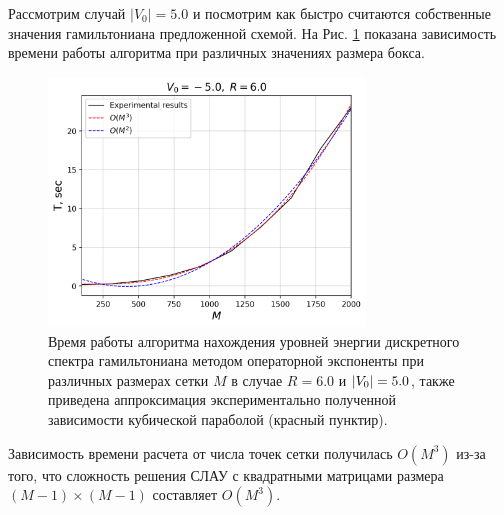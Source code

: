 \documentclass[11pt]{article}
\begin{document}
Рассмотрим случай $|V_0|=5.0$ и посмотрим как быстро считаются собственные значения гамильтониана предложенной схемой. На Рис. \ref{fig:T_vs_M_-5.0} показана зависимость времени работы алгоритма при различных значениях размера бокса.
\begin{figure}[htbp]
    \centering
    \includegraphics[width=0.75\textwidth]{../figures/T_vs_M_-5.0}
    \caption{Время работы алгоритма нахождения уровней энергии дискретного спектра гамильтониана методом операторной экспоненты при различных размерах сетки $M$ в случае $R=6.0$ и $\abs{V_0}=5.0$, также приведена аппроксимация экспериментально полученной зависимости кубической параболой (красный пунктир).}
    \label{fig:T_vs_M_-5.0}
\end{figure}
Зависимость времени расчета от числа точек сетки получилась $O(M^3)$ из-за того, что сложность решения СЛАУ с квадратными матрицами размера $(M-1)\times (M-1)$ составляет  $O(M^3)$.
\end{document}
